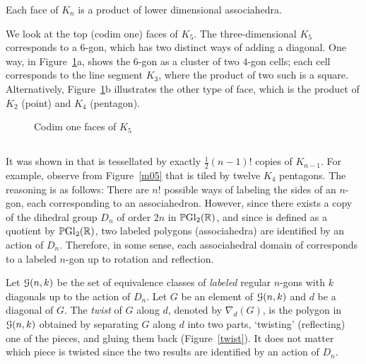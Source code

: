 \documentclass[10pt]{amsart}
\begin{document}
\begin{prop} \textup{\cite[\S2]{jds}} \label{p:product}
Each face of $K_n$ is a product of lower dimensional associahedra.
\end{prop}

\begin{exmp}
We look at the top (codim one) faces of $K_5$. The three-dimensional $K_5$ corresponds to a 6-gon, which has two distinct ways of adding a diagonal.  One way, in Figure~\ref{k5codim1}a, shows the $6$-gon as a cluster of two $4$-gon cells; each cell corresponds to the line segment $K_3$, where the product of two such is a square. Alternatively, Figure~\ref{k5codim1}b illustrates the other type of face, which is the product of $K_2$ (point) and $K_4$ (pentagon).
\end{exmp}

\begin{figure} [h]
\caption{Codim one faces of $K_5$}
\label{k5codim1}
\end{figure}


\subsection{}
It was shown in \cite[\S2]{dev} that  is tessellated by exactly $\frac{1}{2}(n-1)!$ copies of $K_{n-1}$. For example, observe from Figure~\ref{m05} that  is tiled by twelve $K_4$ pentagons.  The reasoning is as follows: There are $n!$ possible ways of labeling the sides of an $n$-gon, each corresponding to an associahedron.  However, since there exists a copy of the dihedral group $D_n$ of order $2n$ in ${\mathbb P} {\rm Gl}_2({\mathbb R})$, and since  is defined as a quotient by ${\mathbb P} {\rm Gl}_2({\mathbb R})$, two labeled polygons (associahedra) are identified by an action of $D_n$. Therefore, in some sense, each associahedral domain of  corresponds to a labeled $n$-gon up to rotation and reflection.

\begin{defn}
Let ${\mathcal G}(n,k)$ be the set of equivalence classes of {\em labeled} regular $n$-gons with $k$ diagonals up to the action of $D_n$. Let $G$ be an element of ${\mathcal G}(n,k)$ and $d$ be a diagonal of $G$.  The {\em twist} of $G$ along $d$, denoted by $\nabla_d(G)$, is the polygon in ${\mathcal G}(n,k)$ obtained by separating $G$ along $d$ into two parts, `twisting' (reflecting) one of the pieces, and gluing them back (Figure~\ref{twist}).  It does not matter which piece is twisted since the two results are identified by an action of $D_n$.
\end{defn}
\end{document}
